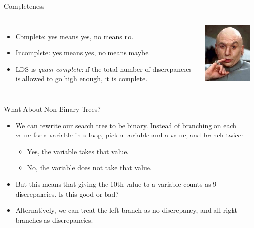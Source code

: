 \documentclass{beamer}
\begin{document}
\begin{frame}{Completeness}
    \begin{columns}
        \begin{itemize}
            \item Complete: yes means yes, no means no.
            \item Incomplete: yes means yes, no means maybe.
            \item LDS is \emph{quasi-complete}: if the total number of discrepancies is allowed to go
                high enough, it is complete.
        \end{itemize}
        \centering\includegraphics*[keepaspectratio=true,scale=0.4]{quasi.jpg}
    \end{columns}
\end{frame}

\begin{frame}{What About Non-Binary Trees?}
    \begin{itemize}
        \item We can rewrite our search tree to be binary. Instead of branching on each value for a
            variable in a loop, pick a variable and a value, and branch twice:

            \begin{itemize}
                \item Yes, the variable takes that value.
                \item No, the variable does not take that value.
            \end{itemize}

        \item But this means that giving the 10th value to a variable counts as 9 discrepancies. Is
            this good or bad?

        \item Alternatively, we can treat the left branch as no discrepancy, and all right branches
            as discrepancies.
    \end{itemize}
\end{frame}
\end{document}
